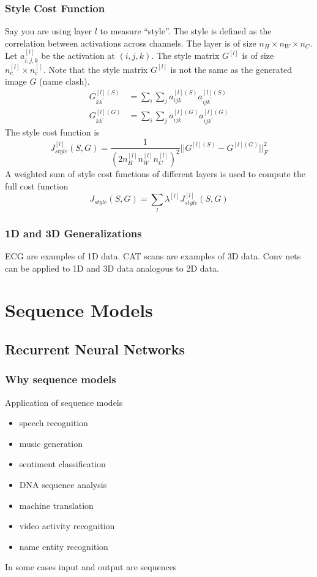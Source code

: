 \documentclass{article}
\begin{document}
\subsubsection{Style Cost Function}
Say you are using layer $l$ to measure ``style''.
The style is defined as the correlation between activations across channels.
The layer is of size $n_H\times n_W\times n_C$.
Let $a^{[l]}_{i,j,k}$ be the activation at $(i,j,k)$.
The style matrix $G^{[l]}$ is of size $n_c^{[l]}\times n_c^{[]}$.
Note that the style matrix $G^{[l]}$ is not the same as the generated image $G$ (name clash).
\begin{equation}
  \begin{split}
    G^{[l](S)}_{kk^\prime}&=\sum_i\sum_j a^{[l](S)}_{ijk} a^{[l](S)}_{ijk^\prime}\\
    G^{[l](G)}_{kk^\prime}&=\sum_i\sum_j a^{[l](G)}_{ijk} a^{[l](G)}_{ijk^\prime}
  \end{split}
\end{equation}
The style cost function is
\begin{equation}
  J^{[l]}_{style}(S, G)=\frac{1}{(2n^{[l]}_Hn^{[l]}_Wn^{[l]}_C)^2}||G^{[l](S)}-G^{[l](G)}||^2_F
\end{equation}
A weighted sum of style cost functions of different layers is used to compute the full cost function
\begin{equation}
  J_{style}(S,G)=\sum_l \lambda^{[l]} J^{[l]}_{style}(S,G)
\end{equation}

\subsubsection{1D and 3D Generalizations}
ECG are examples of 1D data.
CAT scans are examples of 3D data.
Conv nets can be applied to 1D and 3D data analogous to 2D data.

\section{Sequence Models}
\subsection{Recurrent Neural Networks}
\subsubsection{Why sequence models}
Application of sequence models
\begin{itemize}
  \item speech recognition
  \item music generation
  \item sentiment classification
  \item DNA sequence analysis
  \item machine translation
  \item video activity recognition
  \item name entity recognition
\end{itemize}
In some cases input and output are sequences
\end{document}
